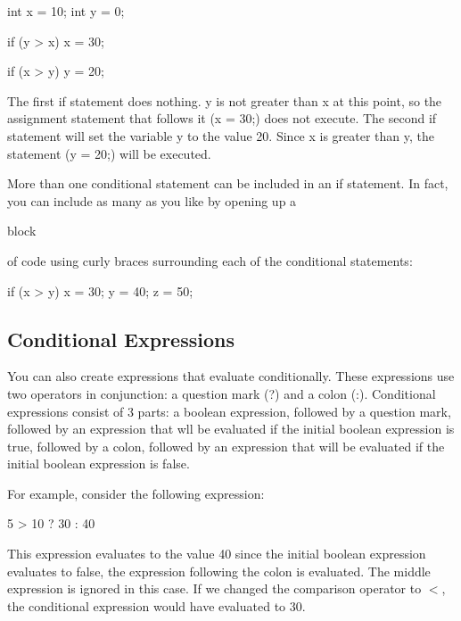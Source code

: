 \begin{code}
int x = 10;
int y = 0;

if (y > x) x = 30;

if (x > y) y = 20;

\end{code}

The first if statement does nothing. y is not greater than x at this point, so the assignment statement that follows it (x = 30;) does not execute. The second if statement will set the variable y to the value 20. Since x is greater than y, the statement (y = 20;) will be executed. 

More than one conditional statement can be included in an if statement. In fact, you can include as many as you like by opening up a \begin{textbf}block\end{textbf} of code using curly braces surrounding each of the conditional statements:

\begin{code}

if (x > y) {
  x = 30;
  y = 40;
  z = 50;
}

\end{code}

\subsection{Conditional Expressions}
You can also create expressions that evaluate conditionally. These expressions use two operators in conjunction: a question mark (?) and a colon (:). Conditional expressions consist of 3 parts: a boolean expression, followed by a question mark, followed by an expression that wll be evaluated if the initial  boolean expression is true, followed by a colon, followed by an expression that will be evaluated if the initial boolean expression is false.

For example, consider the following expression:

\begin{code}

5 > 10 ? 30 : 40

\end{code}

This expression evaluates to the value 40 since the initial boolean expression evaluates to false, the expression following the colon is evaluated. The middle expression is ignored in this case. If we changed the comparison operator to $<$, the conditional expression would have evaluated to 30. 

